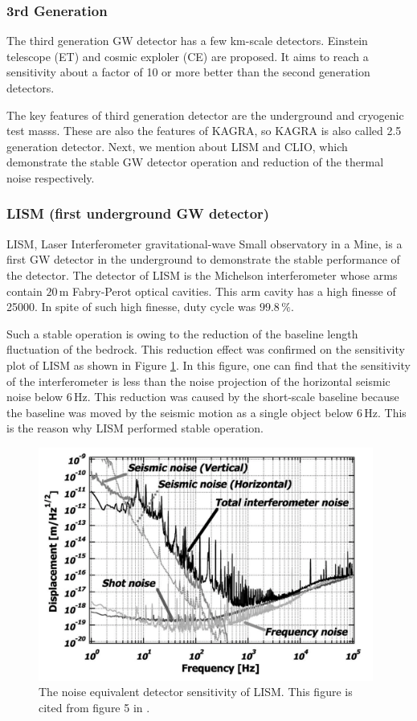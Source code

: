 \subsubsection{3rd Generation}
The third generation GW detector has a few km-scale detectors. Einstein telescope (ET) and cosmic exploler (CE) \cite{abbott2017exploring} are proposed. It aims to reach a sensitivity about a factor of 10 or more better than the second generation detectors.

The key features of third generation detector are the underground and cryogenic test masss. These are also the features of KAGRA, so KAGRA is also called 2.5 generation detector. Next, we mention about LISM and CLIO, which demonstrate the stable GW detector operation and reduction of the thermal noise respectively.


\subsubsection{LISM (first underground GW detector)} \label{sec:141_lism}
LISM, Laser Interferometer gravitational-wave Small observatory in a Mine, is a first GW detector in the underground to demonstrate the stable performance of the detector. The detector of LISM is the Michelson interferometer whose arms contain $20\,\mathrm{m}$ Fabry-Perot optical cavities. This arm cavity has a high finesse of 25000. In spite of such high finesse, duty cycle was $99.8\,\%$.

Such a stable operation is owing to the reduction of the baseline length fluctuation of the bedrock. This reduction effect was confirmed on the sensitivity plot of LISM as shown in Figure \ref{img:img122}. In this figure, one can find that the sensitivity of the interferometer is less than the noise projection of the horizontal seismic noise below $6\,\mathrm{Hz}$. This reduction was caused by the short-scale baseline because the baseline was moved by the seismic motion as a single object below $6\,\mathrm{Hz}$. This is the reason why LISM performed stable operation. 
\begin{figure}[h]
  \begin{center}   
    \includegraphics[width=11cm]{./img_chap1/img122.png}
    \caption{The noise equivalent detector sensitivity of LISM. This figure is cited from figure 5 in \cite{sato2004ultrastable}. } \label{img:img122}
  \end{center}
\end{figure}


